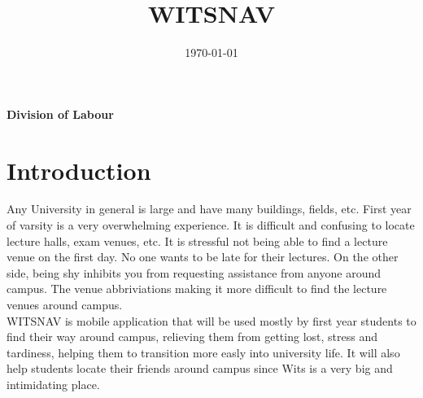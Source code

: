 \documentclass[a4paper, 12pt]{article}
\title{\textbf{WITSNAV}}
\date{\today}
\begin{document}
{\let\newpage\relax\maketitle}
\textbf{\large{Division of Labour}}
\newline
\newline


\newpage

\tableofcontents
{}
\newpage
{}

\section{Introduction}
Any University in general is large and have many buildings, fields, etc. First year of varsity is a very overwhelming experience. It is difficult and confusing to locate lecture halls, exam venues, etc. It is stressful not being able to find a lecture venue on the first day. No one wants to be late for their lectures. On the other side, being shy inhibits you from requesting assistance from anyone around campus. The venue abbriviations making it more difficult to find the lecture venues around campus.\\   
WITSNAV is mobile application that will be used mostly by first year students to find their way around campus, relieving them from getting lost, stress and tardiness, helping them to transition more easly into university life. It will also help students locate their friends around campus since Wits is a very big and intimidating place. 
\end{document}
